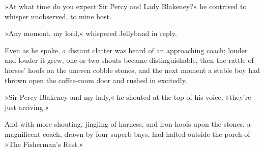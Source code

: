 »At what time do you expect Sir Percy and Lady Blakeney?« he contrived to whisper unobserved, to mine host.

»Any moment, my lord,« whispered Jellyband in reply.

Even as he spoke, a distant clatter was heard of an approaching coach; louder and louder it grew, one or two shouts became distinguishable, then the rattle of horses' hoofs on the uneven cobble stones, and the next moment a stable boy had thrown open the coffee-room door and rushed in excitedly.

»Sir Percy Blakeney and my lady,« he shouted at the top of his voice, »they're just arriving.«

And with more shouting, jingling of harness, and iron hoofs upon the stones, a magnificent coach, drawn by four superb bays, had halted outside the porch of »The Fisherman's Rest.«
